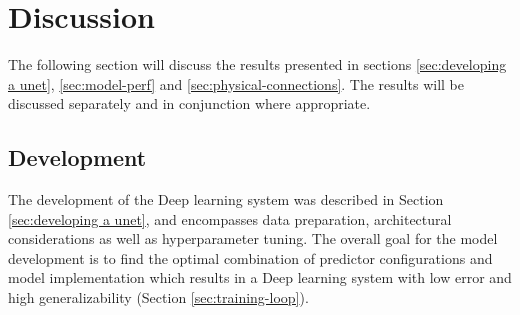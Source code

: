 \documentclass[../main/thesis]{subfiles}
\begin{document}
\section{Discussion}
\label{sec:discussion}
The following section will discuss the results presented in sections \ref{sec:developing a unet}, \ref{sec:model-perf} and \ref{sec:physical-connections}. The results will be discussed separately and in conjunction where appropriate.

\subsection{Development}
The development of the Deep learning system was described in Section \ref{sec:developing a unet}, and encompasses data preparation, architectural considerations as well as hyperparameter tuning. The overall goal for the model development is to find the optimal combination of predictor configurations and model implementation which results in a Deep learning system with low error and high generalizability (Section \ref{sec:training-loop}).
\end{document}
